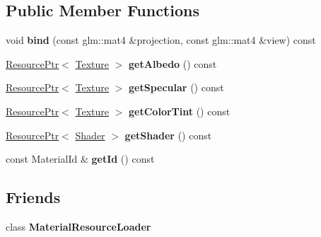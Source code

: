 \subsection*{Public Member Functions}
\begin{DoxyCompactItemize}
\item 
\mbox{\label{classTarbora_1_1Material_a0213f53bfa2f50ea3e889bc3126b7ef3}} 
void {\bfseries bind} (const glm\+::mat4 \&projection, const glm\+::mat4 \&view) const
\item 
\mbox{\label{classTarbora_1_1Material_ac05f6ce6587b9d0fb7f0cbdaf5ad6947}} 
\hyperlink{classTarbora_1_1ResourcePtr}{Resource\+Ptr}$<$ \hyperlink{classTarbora_1_1Texture}{Texture} $>$ {\bfseries get\+Albedo} () const
\item 
\mbox{\label{classTarbora_1_1Material_a819f176609d10d9656eea6a4408b5e14}} 
\hyperlink{classTarbora_1_1ResourcePtr}{Resource\+Ptr}$<$ \hyperlink{classTarbora_1_1Texture}{Texture} $>$ {\bfseries get\+Specular} () const
\item 
\mbox{\label{classTarbora_1_1Material_aaa315c32155b479faf68b5c863fffc4a}} 
\hyperlink{classTarbora_1_1ResourcePtr}{Resource\+Ptr}$<$ \hyperlink{classTarbora_1_1Texture}{Texture} $>$ {\bfseries get\+Color\+Tint} () const
\item 
\mbox{\label{classTarbora_1_1Material_a475e8a592a05c066d51ce6036892632c}} 
\hyperlink{classTarbora_1_1ResourcePtr}{Resource\+Ptr}$<$ \hyperlink{classTarbora_1_1Shader}{Shader} $>$ {\bfseries get\+Shader} () const
\item 
\mbox{\label{classTarbora_1_1Material_a9154fd913cb8fca43d255f179a16774b}} 
const Material\+Id \& {\bfseries get\+Id} () const
\end{DoxyCompactItemize}
\subsection*{Friends}
\begin{DoxyCompactItemize}
\item 
\mbox{\label{classTarbora_1_1Material_a87679ccfa9db36081c479686a6e33e77}} 
class {\bfseries Material\+Resource\+Loader}
\end{DoxyCompactItemize}
